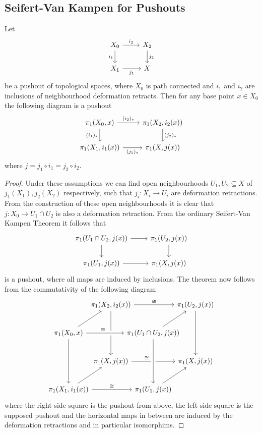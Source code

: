 \subsection{Seifert-Van Kampen for Pushouts}

\begin{theorem}
    Let  
    \[\begin{tikzcd}
	{X_0} & {X_2} \\
	{X_1} & X
	\arrow["{i_2}", from=1-1, to=1-2]
	\arrow["{i_1}"', from=1-1, to=2-1]
	\arrow["{j_2}", from=1-2, to=2-2]
	\arrow["{j_1}"', from=2-1, to=2-2]
\end{tikzcd}\]
    be a pushout of topological spaces, where $X_0$ is path connected and $i_1$ and $i_2$ are inclusions of neighbourhood deformation retracts. Then for any base point $x \in X_0$ the following diagram is a pushout
    \[\begin{tikzcd}
	{\pi_1(X_0,x)} & {\pi_1(X_2,i_2(x))} \\
	{\pi_1(X_1,i_1(x))} & {\pi_1(X,j(x))}
	\arrow["{(i_2)_\ast}", from=1-1, to=1-2]
	\arrow["{(i_1)_\ast}"', from=1-1, to=2-1]
	\arrow["{(j_2)_\ast}", from=1-2, to=2-2]
	\arrow["{(j_1)_\ast}"', from=2-1, to=2-2]
\end{tikzcd}\]
where $ j = j_1 \circ i_1 = j_2 \circ i_2$.
\end{theorem}
\begin{proof}
    Under these assumptions we can find open neighbourhoods $U_1, U_2 \subseteq X$ of $j_1(X_1), j_2(X_2)$ respectively, such that $j_i \colon X_i \to U_i$ are deformation retractions. From the construction of these open neighbourhoods it is clear that $j \colon X_0 \to U_1 \cap U_2$ is also a deformation retraction. From the ordinary Seifert-Van Kampen Theorem it follows that 
    \[\begin{tikzcd}
	{\pi_1(U_1 \cap U_2,j(x))} & {\pi_1(U_2,j(x))} \\
	{\pi_1(U_1,j(x))} & {\pi_1(X,j(x))}
	\arrow[from=1-1, to=1-2]
	\arrow[from=1-1, to=2-1]
	\arrow[from=1-2, to=2-2]
	\arrow[from=2-1, to=2-2]
\end{tikzcd}\]
is a pushout, where all maps are induced by inclusions. The theorem now follows from the commutativity of the following diagram 
\[\begin{tikzcd}[row sep={40,between origins}, column sep={60,between origins}]
      & \pi_1(X_2,i_2(x)) \ar["\cong"]{rr}\ar{dd}& & \pi_1(U_2,j(x)) \ar{dd} \\
    \pi_1(X_0,x) \ar["\cong"{pos=0.45}, crossing over]{rr} \ar{dd}\ar{ur} & & \pi_1(U_1 \cap U_2,j(x))\ar{ur} \\
      & \pi_1(X,j(x))  \ar["\cong"{pos=0.35}]{rr} & &  \pi_1(X,j(x)) \\
    \pi_1(X_1,i_1(x)) \ar["\cong"]{rr}\ar{ur} && \pi_1(U_1,j(x)) \ar[from=uu,crossing over]\ar{ur}
\end{tikzcd}\]
where the right side square is the pushout from above, the left side square is the supposed pushout and the horizontal maps in between are induced by the deformation retractions and in particular isomorphims.
\end{proof}